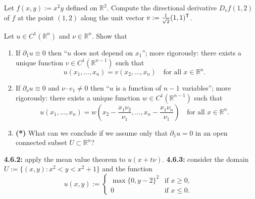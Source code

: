 



\begin{aiexercise}
\label{ex:ai_directional_derivative}
Let $f(x,y) := x^2 y$ defined on $\mathbb{R}^2$. Compute the directional derivative $D_v f(1,2)$ of $f$ at the point $(1,2)$ along the unit vector $v := \frac{1}{\sqrt{2}}(1,1)^{\mathsf{T}}$.
\end{aiexercise}


\begin{exercise}
\label{ex:directional_derivative_vanishes}
Let $u \in C^1(\mathbb{R}^n)$ and $\nu \in \mathbb{R}^n$. Show that
\begin{enumerate}[label=\textbf{(\alph*)}]
  \item If $\partial_1 u \equiv 0$ then ``$u$ does not depend on $x_1$''; more rigorously: there
    exists a unique function $v \in C^1(\mathbb{R}^{n-1})$ such that
    \begin{equation*}
    u(x_1,\dots,x_n) = v(x_2,\dots,x_n) \quad \text{for all } x \in \mathbb{R}^n. \tag{2}
    \end{equation*}
  \item If $\partial_\nu u \equiv 0$ and $\nu\cdot e_1 \neq 0$ then ``$u$ is a function of $n-1$
    variables''; more rigorously: there exists a unique function $w \in C^1(\mathbb{R}^{n-1})$
    such that
    \[u(x_1,\dots,x_n) = w\!\left(x_2 - \frac{x_1\nu_2}{\nu_1}, \dots, x_n - \frac{x_1\nu_n}{\nu_1}\right) \quad \text{for all } x \in \mathbb{R}^n.\]
  \item \textbf{(*)} What can we conclude if we assume only that $\partial_1 u = 0$ in an open
    connected subset $U \subset \mathbb{R}^n$?
\end{enumerate}
\begin{exercisehint}
\textbf{4.6.2:} apply the mean value theorem to $u(x + t\nu)$.
\textbf{4.6.3:} consider the domain $U := \{(x,y) : x^2 < y < x^2+1\}$ and the function
\[u(x,y) := \begin{cases} \max\{0, y-2\}^2 & \text{if } x \geq 0, \\ 0 & \text{if } x \leq 0.\end{cases}\]
\end{exercisehint}
\end{exercise}

